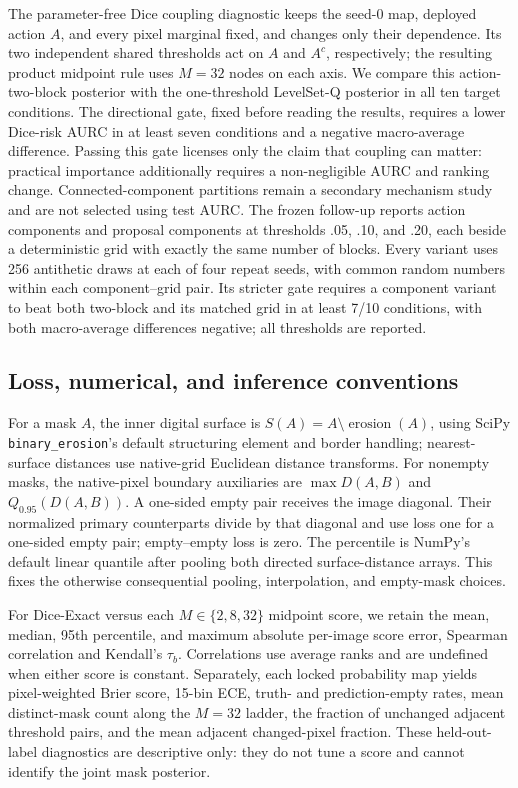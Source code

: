 The parameter-free Dice coupling diagnostic keeps the seed-0 map, deployed
action \(A\), and every pixel marginal fixed, and changes only their dependence.
Its two independent shared thresholds act on \(A\) and \(A^c\), respectively;
the resulting product midpoint rule uses \(M=32\) nodes on each axis. We compare
this action-two-block posterior with the one-threshold LevelSet-Q posterior in
all ten target conditions.  The directional gate, fixed before reading the
results, requires a lower Dice-risk AURC in at least seven conditions and a
negative macro-average difference.  Passing this gate licenses only the claim
that coupling can matter: practical importance additionally requires a
non-negligible AURC and ranking change.  Connected-component partitions remain
a secondary mechanism study and are not selected using test AURC. The frozen
follow-up reports action components and proposal components at thresholds
.05, .10, and .20, each beside a deterministic grid with exactly the same
number of blocks. Every variant uses 256 antithetic draws at each of four repeat
seeds, with common random numbers within each component--grid pair. Its stricter
gate requires a component
variant to beat both two-block and its matched grid in at least 7/10 conditions,
with both macro-average differences negative; all thresholds are reported.

\subsection{Loss, numerical, and inference conventions}

For a mask \(A\), the inner digital surface is
\(S(A)=A\setminus\operatorname{erosion}(A)\), using SciPy
\texttt{binary\_erosion}'s default structuring element and border handling;
nearest-surface distances use native-grid Euclidean distance transforms.
For nonempty masks, the native-pixel boundary auxiliaries are
\(\max D(A,B)\) and \(Q_{0.95}(D(A,B))\). A one-sided empty pair receives the
image diagonal. Their normalized primary counterparts divide by that diagonal
and use loss one for a one-sided empty pair; empty--empty loss is zero. The
percentile is NumPy's default linear quantile after pooling both directed
surface-distance arrays. This fixes the otherwise consequential pooling,
interpolation, and empty-mask choices.

For Dice-Exact versus each \(M\in\{2,8,32\}\) midpoint score, we retain the
mean, median, 95th percentile, and maximum absolute per-image score error,
Spearman correlation and Kendall's \(\tau_b\).
Correlations use average ranks and are undefined when either score is constant.
Separately, each locked probability map yields pixel-weighted Brier score,
15-bin ECE, truth- and prediction-empty rates, mean distinct-mask count along
the \(M=32\) ladder, the fraction of unchanged adjacent threshold pairs, and
the mean adjacent changed-pixel fraction. These held-out-label diagnostics are
descriptive only: they do not tune a score and cannot identify the joint mask
posterior.

